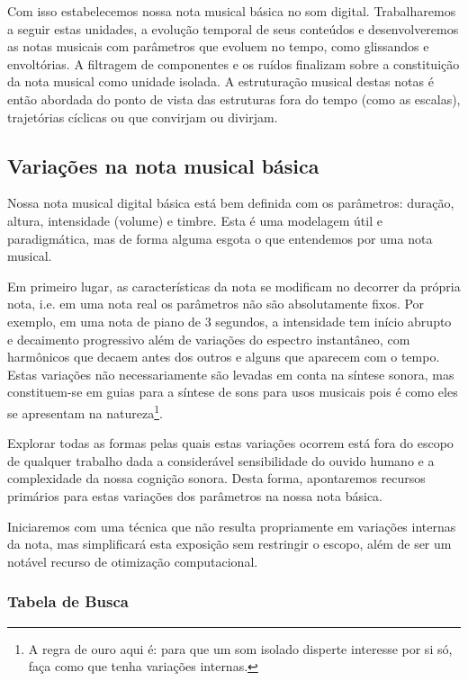 Com isso estabelecemos nossa nota musical básica no som digital. Trabalharemos a seguir estas unidades, a evolução temporal de seus conteúdos e desenvolveremos as notas musicais com parâmetros que evoluem no tempo, como glissandos e envoltórias. 
A filtragem de componentes e os ruídos finalizam sobre a constituição da nota musical como unidade isolada. A estruturação musical destas notas é então abordada do ponto de vista das estruturas fora do tempo (como as escalas), trajetórias cíclicas ou que convirjam ou divirjam.

\clearpage

\subsection{Variações na nota musical básica}

Nossa nota musical digital básica está bem definida com os parâmetros:
duração, altura, intensidade (volume) e timbre. Esta é uma modelagem
útil e paradigmática, mas de forma alguma esgota o que entendemos por
uma nota musical.

Em primeiro lugar, as características da nota se modificam no decorrer
da própria nota, i.e. em uma nota real os parâmetros
não são absolutamente fixos. Por exemplo, em uma nota de piano
de 3 segundos, a intensidade tem início abrupto e decaimento progressivo
além de variações do espectro instantâneo, com harmônicos que
decaem antes dos outros e alguns que aparecem com o tempo.
Estas variações não necessariamente são levadas
em conta na síntese sonora, mas constituem-se em guias para a
síntese de sons para usos musicais pois é como eles
se apresentam na natureza\footnote{A regra de ouro
aqui é: para que um som isolado disperte interesse
por si só, faça como que tenha variações internas.}. 

Explorar todas as formas pelas quais estas variações ocorrem está fora
do escopo de qualquer trabalho dada a considerável sensibilidade do ouvido humano
e a complexidade da nossa cognição sonora. Desta forma, apontaremos
recursos primários para estas variações dos parâmetros na nossa nota
básica.

Iniciaremos com uma técnica que não resulta propriamente
em variações internas da nota, mas simplificará esta exposição
sem restringir o escopo, além de ser um notável recurso de otimização
computacional.



\subsubsection{Tabela de Busca}

